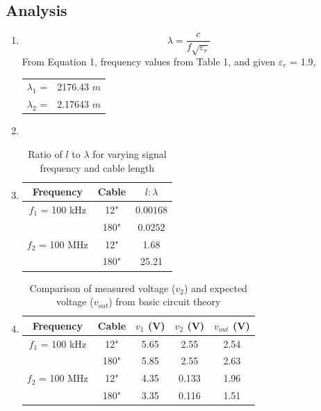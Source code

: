 \documentclass{article}
\begin{document}
\subsection{Analysis}
\begin{enumerate}
	\item 
	\begin{equation}
		\lambda = \frac{c}{f\sqrt{\varepsilon_{r}}}
	\end{equation}
	From Equation 1, frequency values from Table 1, and given $\varepsilon_{r}$ = 1.9,
	\begin{table}[h]
	\centering
		\begin{tabular}{rl}
		$\lambda_{1}$ =  & 2176.43 $m$  \\
		$\lambda_{2}$ =  & 2.17643 $m$      
		\end{tabular}
	\end{table}
	
	\item
	\item
	\begin{table}[H]
		\centering
		\begin{tabular}{|c|c|c|}
		\hline
		\textbf{Frequency} & \textbf{Cable}  & $l:\lambda$   \\ \hline
		$f_1$ = 100 kHz    & 12"             & $0.00168$     \\ \hline
		                   & 180"            & $0.0252$      \\ \hline
		$f_2$ = 100 MHz    & 12"             & 1.68          \\ \hline
		                   & 180"            & 25.21         \\ \hline
		\end{tabular}
		\caption{Ratio of $l$ to $\lambda$ for varying signal frequency and cable length}
		\label{Analysis 1.2}
	\end{table}
	
	\item
	\begin{table}[H]
	\centering
		\begin{tabular}{|c|c|c|c|c|}
		\hline
		\textbf{Frequency} & \textbf{Cable} & $v_1$ (V) & $v_2$ (V) & $v_{out}$ (V) \\ \hline
		$f_1$ = 100 kHz    & 12"            & 5.65      & 2.55      & 2.54          \\ \hline
		                   & 180"           & 5.85      & 2.55      & 2.63     	   \\ \hline
		$f_2$ = 100 MHz    & 12"            & 4.35      & 0.133     & 1.96          \\ \hline
		                   & 180"           & 3.35      & 0.116     & 1.51          \\ \hline
		\end{tabular}
		\caption{Comparison of measured voltage ($v_2$) and expected voltage ($v_{out}$) from basic circuit theory}
		\label{Analysis 1.3}
	\end{table}
	

\end{enumerate}
\end{document}

